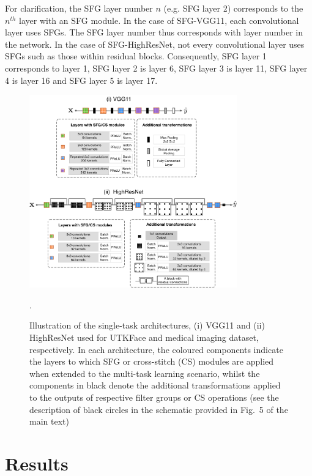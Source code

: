 For clarification, the SFG layer number $n$ (e.g. SFG layer 2) corresponds to the $n^{th}$ layer with an SFG module. In the case of SFG-VGG11, each convolutional layer uses SFGs. The SFG layer number thus corresponds with layer number in the network. In the case of SFG-HighResNet, not every convolutional layer uses SFGs such as those within residual blocks. Consequently, SFG layer 1 corresponds to layer 1, SFG layer 2 is layer 6, SFG layer 3 is layer 11, SFG layer 4 is layer 16 and SFG layer 5 is layer 17.

\begin{figure}[h]
	\centering
	\includegraphics[width=0.80\textwidth]{chapter_6/figures_supp/supp_single_task.pdf}
	\caption{\footnotesize Illustration of the single-task architectures, (i) VGG11 and (ii) HighResNet used for UTKFace and medical imaging dataset, respectively. In each architecture, the coloured components indicate the layers to which SFG or cross-stitch (CS) modules are applied when extended to the multi-task learning scenario, whilst the components in black denote the additional transformations applied to the outputs of respective filter groups or CS operations (see the description of black circles in the schematic provided in Fig.~5 of the main text)}. 
	\label{fig:supp_baselines}
\end{figure}



\section{Results}
